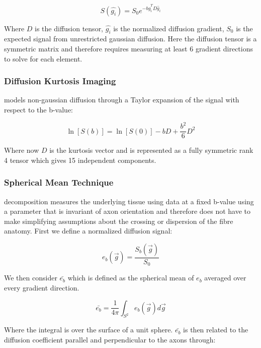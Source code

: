 \begin{equation}
    S(\hat{g_i}) = S_0 e^{-b \hat{g}_i^T D \hat{g}_i}
    \label{eq:dti}
\end{equation}

Where $D$ is the diffusion tensor, $\hat{g_i}$ is the normalized diffusion gradient, $S_0$ is the expected signal from unrestricted gaussian diffusion. Here the diffusion tensor is a symmetric matrix and therefore requires measuring at least 6 gradient directions to solve for each element. \cite{vedantam2014diffusion}

\subsubsection{Diffusion Kurtosis Imaging}
\dki models non-gaussian diffusion through a Taylor expansion of the signal with respect to the b-value:

\begin{equation}
    \ln[S(b)] = \ln[S(0)] - b D + \frac{b^2}{6} D^2
\end{equation}

Where now $D$ is the kurtosis vector and is represented as a fully symmetric rank 4 tensor which gives 15 independent components. \cite{jensen2005diffusional}

\subsubsection{Spherical Mean Technique}
\smt decomposition measures the underlying tissue using data at a fixed b-value using a parameter that is invariant of axon orientation and therefore does not have to make simplifying assumptions about the crossing or dispersion of the fibre anatomy. First we define a normalized diffusion signal:

\begin{equation}
    e_b(\vec{g}) = \frac{S_b(\vec{g})}{S_0}
\end{equation}

We then consider $\bar{e_b}$ which is defined as the spherical mean of $e_b$ averaged over every gradient direction.

\begin{equation}
    \bar{e_b} = \frac{1}{4\pi} \int_{S^2} e_b(\vec{g}) d\vec{g}
\end{equation}

Where the integral is over the surface of a unit sphere. $\bar{e_b}$ is then related to the diffusion coefficient parallel and perpendicular to the axons through:

